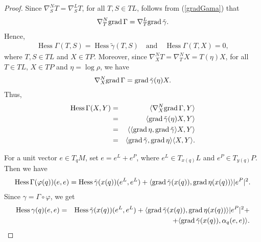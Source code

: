 \documentclass[a4paper]{amsart}
\begin{document}
\begin{proof}
Since $ \nabla^{N}_{S}T = \nabla^{L}_{S}T $, for all $ T,S \in TL $, follows from (\ref{gradGama}) that
\begin{eqnarray*}
\nabla_{T}^{N}{{{\rm{grad}\,}}} \Gamma = \nabla^{L}_{T}{{{\rm{grad}\,}}} \tilde{\gamma} .
\end{eqnarray*}
Hence,
\begin{eqnarray*}
\operatorname{Hess}\Gamma(T,S) = \operatorname{Hess}\tilde{\gamma}(T,S) \quad \mbox{and} \quad \operatorname{Hess}\Gamma(T,X) = 0,
\end{eqnarray*}
where $ T,S \in TL $ and $ X \in TP $. Moreover, since $ \nabla^{N}_{X}T = \nabla^{N}_{T}X = T(\eta)X $, for all $ T \in TL $, $ X \in TP $ and $ \eta = \log\rho $, we have 
\begin{eqnarray*}
\nabla^{N}_{X}{{{\rm{grad}\,}}} \Gamma = {{{\rm{grad}\,}}} \tilde{\gamma}(\eta)X .
\end{eqnarray*}
Thus,
\begin{eqnarray*}
\operatorname{Hess}\Gamma(X,Y) &=& \langle \nabla^{N}_{X}{{{\rm{grad}\,}}} \Gamma,Y\rangle \nonumber \\
&=& \langle {{{\rm{grad}\,}}} \tilde{\gamma}(\eta)X,Y\rangle \nonumber \\
&=& \langle \langle {{{\rm{grad}\,}}} \eta,{{{\rm{grad}\,}}} \tilde{\gamma}\rangle X,Y\rangle \nonumber \\
&=& \langle {{{\rm{grad}\,}}} \tilde{\gamma},{{{\rm{grad}\,}}} \eta\rangle\langle X,Y \rangle .
\end{eqnarray*}

For a unit vector $ e \in T_{q}M $, set $ e = e^L + e^P $, where $ e^L \in T_{x(q)}L $ and $ e^P \in T_{y(q)}P $. Then we have
\begin{eqnarray*}
\operatorname{Hess}\Gamma(\varphi(q))(e,e) = \operatorname{Hess}\tilde{\gamma}(x(q))(e^L,e^L) + \langle {{{\rm{grad}\,}}} \tilde{\gamma}(x(q)),{{{\rm{grad}\,}}} \eta(x(q))\rangle\vert e^P\vert^2 .
\end{eqnarray*}
Since $ \gamma = \Gamma\circ\varphi $, we get
\begin{eqnarray}\label{expression1}
\operatorname{Hess} \gamma(q)(e,e) &=& \operatorname{Hess}\tilde{\gamma}(x(q))(e^L,e^L) + \langle {{{\rm{grad}\,}}} \tilde{\gamma}(x(q)),{{{\rm{grad}\,}}} \eta(x(q))\rangle\vert e^P\vert^2 + \nonumber \\
&&+ \langle {{{\rm{grad}\,}}} \tilde{\gamma}(x(q)),\alpha_{q}(e,e)\rangle .
\end{eqnarray}


\end{proof}
\end{document}
